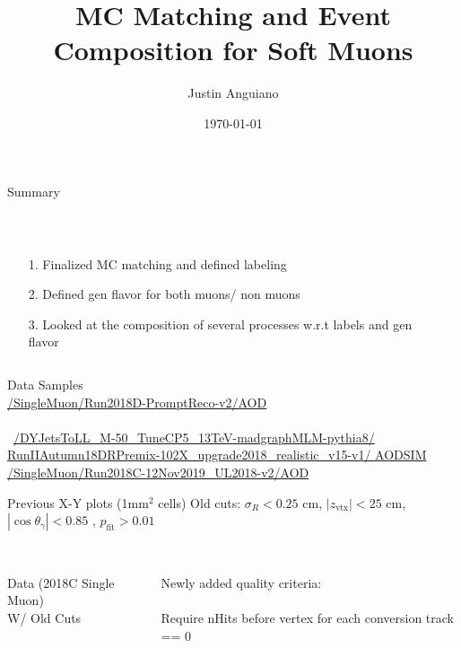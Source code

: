 \documentclass[10pt,handout]{beamer}
\author{Justin Anguiano}
\title{MC Matching and Event Composition for Soft Muons}
\institute{University of Kansas}
\date{\today}
\begin{document}
\begin{frame}
\titlepage
\end{frame}



\begin{frame}{Summary}

\begin{columns}
\begin{column}{0.5\textwidth}
 \\
\begin{itemize}
\item[1.] Finalized MC matching and defined labeling
\item[2.] Defined gen flavor for both muons/ non muons
\item[3.] Looked at the composition of several processes w.r.t labels and gen flavor
\end{itemize}

\end{column}
\begin{column}{0.5\textwidth}
\end{column}
\end{columns}
\end{frame}

\begin{frame}{Data Samples}
\\
 \url{/SingleMuon/Run2018D-PromptReco-v2/AOD}\\
\quad \quad \\\
 \url{/DYJetsToLL_M-50_TuneCP5_13TeV-madgraphMLM-pythia8/
RunIIAutumn18DRPremix-102X_upgrade2018_realistic_v15-v1/
AODSIM}\\

\url{/SingleMuon/Run2018C-12Nov2019_UL2018-v2/AOD}\\

\end{frame}

\begin{frame}{ Previous X-Y plots (1mm$^2$ cells) } 
Old cuts: $\sigma_R < 0.25$ cm, $|z_{\text{vtx}}|<25$ cm, $|\cos\theta_\gamma| < 0.85$ , $p_{\text{fit}} > 0.01$\\
\quad \quad \\
\begin{columns}
\begin{column}{0.5\textwidth}
Data (2018C Single Muon)\\
W/ Old Cuts\\

\end{column}
\begin{column}{0.5\textwidth}
Newly added quality criteria:\\
\quad \quad \\
\scriptsize
Require nHits before vertex for each conversion track == 0\\
\end{column}
\end{columns}
\end{frame}
\end{document}
